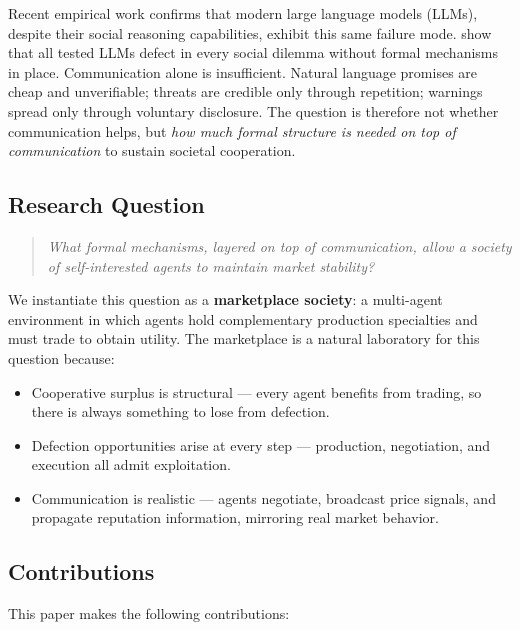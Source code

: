 \documentclass[12pt, a4paper]{article}
\begin{document}
Recent empirical work confirms that modern large language models (LLMs), despite their social reasoning capabilities, exhibit this same failure mode. \citet{coopeval} show that all tested LLMs defect in every social dilemma without formal mechanisms in place. Communication alone is insufficient. Natural language promises are cheap and unverifiable; threats are credible only through repetition; warnings spread only through voluntary disclosure. The question is therefore not whether communication helps, but \textit{how much formal structure is needed on top of communication} to sustain societal cooperation.

\subsection{Research Question}

\begin{quote}
\textit{What formal mechanisms, layered on top of communication, allow a society of self-interested agents to maintain market stability?}
\end{quote}

We instantiate this question as a \textbf{marketplace society}: a multi-agent environment in which agents hold complementary production specialties and must trade to obtain utility. The marketplace is a natural laboratory for this question because:

\begin{itemize}
  \item Cooperative surplus is structural — every agent benefits from trading, so there is always something to lose from defection.
  \item Defection opportunities arise at every step — production, negotiation, and execution all admit exploitation.
  \item Communication is realistic — agents negotiate, broadcast price signals, and propagate reputation information, mirroring real market behavior.
\end{itemize}

\subsection{Contributions}

This paper makes the following contributions:
\end{document}
